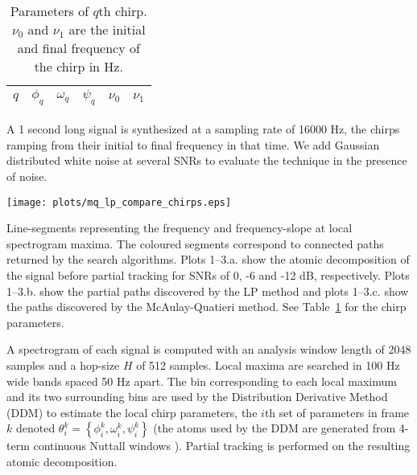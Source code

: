 \documentclass{article}
\begin{document}
\begin{sloppy}
\begin{table}[!b]
    \caption{Parameters of $q$th chirp. $\nu_{0}$ and $\nu_{1}$ are the initial and
    final frequency of the chirp in Hz. \label{tab:ptrackexamplechirpparams}}
    \begin{center}
        \begin{tabular}{l c c c c c}
            $q$ & $\phi_{q}$ & $\omega_{q}$ & $\psi_{q}$ & $\nu_{0}$ & $\nu_{1}$ \\
            \hline
            
        \end{tabular}
    \end{center}
\end{table}

A 1 second long signal is synthesized at a sampling rate of 16000 Hz, the
chirps ramping from their initial to final frequency in that time. We add
Gaussian distributed white noise at several SNRs to evaluate the technique in the
presence of noise.

\begin{figure*}
    \centering
    \centerline{\texttt{[image: plots/mq\_lp\_compare\_chirps.eps]}}
    { Line-segments representing the frequency and frequency-slope at local
        spectrogram maxima. The coloured segments correspond to connected paths
        returned by the search algorithms. Plots 1--3.a. show the atomic
        decomposition of the signal before partial tracking for SNRs of 0, -6
        and -12 dB, respectively. Plots 1--3.b. show the partial paths
        discovered by the LP method and plots 1--3.c. show the paths discovered
        by the McAulay-Quatieri method. 
        See Table~\ref{tab:ptrackexamplechirpparams} for the chirp parameters.
    \label{plot:mq_lp_compare_chirps}}
\end{figure*}

A spectrogram of each signal is computed with an analysis window length of 2048
samples and a hop-size $H$ of 512 samples. Local maxima are searched in 100 Hz
wide bands spaced 50 Hz apart. The bin corresponding to each local maximum and its two
surrounding bins are used by the Distribution Derivative Method
(DDM) \cite{betser2009sinusoidal} to estimate the
local chirp parameters, the $i$th set of parameters in frame $k$ denoted
$\theta_{i}^{k} = \left\{ \phi_{i}^{k} , \omega_{i}^{k} , \psi_{i}^{k}
\right\}$ (the atoms used by the DDM are generated from 4-term continuous
Nuttall windows \cite{nuttall1981some}). Partial tracking is performed on the
resulting atomic decomposition.


\end{sloppy}
\end{document}

